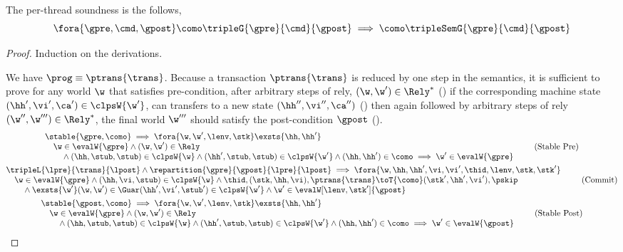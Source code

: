\begin{thm}
\label{thm:per-thread-soundness}
The per-thread soundness is the follows,
\[
    \fora{\gpre, \cmd, \gpost}
    \como \tripleG{\gpre}{\cmd}{\gpost} 
    \implies 
    \como \tripleSemG{\gpre}{\cmd}{\gpost} 
\]
\end{thm}
\begin{proof}
Induction on the derivations.


We have \( \prog \equiv \ptrans{\trans} \).
Because a transaction \( \ptrans{\trans} \) is reduced by one step in the semantics, it is sufficient to prove for any world \(\w\) that satisfies pre-condition, after arbitrary steps of rely, \ie \( (\w, \w') \in \Rely^{*} \) () if the corresponding machine state \((\hh',\vi', \ca') \in \clpsW{\w'}\), can transfers to a new state \((\hh'',\vi'', \ca'')\) () then again followed by arbitrary steps of rely \((\w'',\w''') \in \Rely^{*} \), the final world \( \w''' \) should satisfy the post-condition \(\gpost\) ().
\begin{gather}
    \begin{array}{@{}l}
    \stable{\gpre, \como}  
    \implies 
    \fora{\w, \w',\lenv, \stk}  
    \exsts{ \hh, \hh' } \\
    \quad \w \in \evalW{\gpre} 
    \land (\w, \w') \in \Rely \\
    \qquad {} \land (\hh, \stub, \stub) \in \clpsW{\w}
    \land (\hh', \stub, \stub) \in \clpsW{\w'}
    \land (\hh, \hh') \in \como
    \implies \w' \in \evalW{\gpre} 
    \end{array} \tag{Stable Pre} \label{equ:stable-pre-condition} \\
%
    \begin{array}{@{}l}
    \tripleL{\lpre}{\trans}{\lpost}
    \land \repartition{\gpre}{\gpost}{\lpre}{\lpost}
    \implies 
    \fora{\w, \hh, \hh', \vi, \vi', \thid, \lenv, \stk, \stk'} \\
    \quad \w \in \evalW{\gpre}
    \land (\hh, \vi, \stub) \in \clpsW{\w} 
    \land \thid, (\stk, \hh, \vi), \ptrans{\trans} 
    \toT{\como} (\stk', \hh', \vi'), \pskip  \\
    \qquad {} \land \exsts{\w'}
    (\w, \w') \in \Guar
    (\hh', \vi', \stub') \in \clpsW{\w'} 
    \land \w' \in \evalW[\lenv, \stk']{\gpost} 
    \end{array} \label{equ:commit-transaction} \tag{Commit} \\
%
    \begin{array}{@{}l}
    \stable{\gpost, \como}  
    \implies 
    \fora{\w, \w',\lenv, \stk}  
    \exsts{ \hh, \hh' } \\
    \quad \w \in \evalW{\gpre} 
    \land (\w, \w') \in \Rely \\
    \qquad {} \land (\hh, \stub, \stub) \in \clpsW{\w}
    \land (\hh', \stub, \stub) \in \clpsW{\w'}
    \land (\hh, \hh') \in \como
    \implies \w' \in \evalW{\gpost} 
    \end{array} \tag{Stable Post} \label{equ:stable-post-condition} 
\end{gather}


\end{proof}
